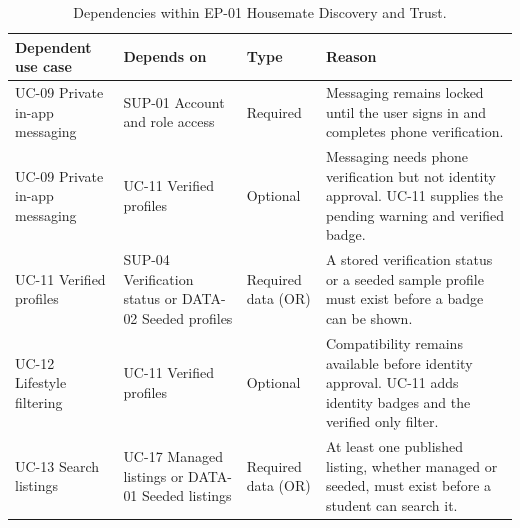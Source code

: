 \documentclass[11pt,a4paper]{article}
\begin{document}
\begin{table}[H]
    \centering
    \small
    \caption{Dependencies within EP-01 Housemate Discovery and Trust.}
    \begin{tabularx}{\textwidth}{@{}L{2.9cm}L{3.3cm}L{2.1cm}Y@{}}
        \toprule
        Dependent use case & Depends on & Type & Reason\\
        \midrule
        UC-09 Private in-app messaging & SUP-01 Account and role access & Required & Messaging remains locked until the user signs in and completes phone verification.\\
        UC-09 Private in-app messaging & UC-11 Verified profiles & Optional & Messaging needs phone verification but not identity approval. UC-11 supplies the pending warning and verified badge.\\
        UC-11 Verified profiles & SUP-04 Verification status or DATA-02 Seeded profiles & Required data (OR) & A stored verification status or a seeded sample profile must exist before a badge can be shown.\\
        UC-12 Lifestyle filtering & UC-11 Verified profiles & Optional & Compatibility remains available before identity approval. UC-11 adds identity badges and the verified only filter.\\
        UC-13 Search listings & UC-17 Managed listings or DATA-01 Seeded listings & Required data (OR) & At least one published listing, whether managed or seeded, must exist before a student can search it.\\
        \bottomrule
    \end{tabularx}
    \label{tabdepsdiscovery}
\end{table}
\end{document}
